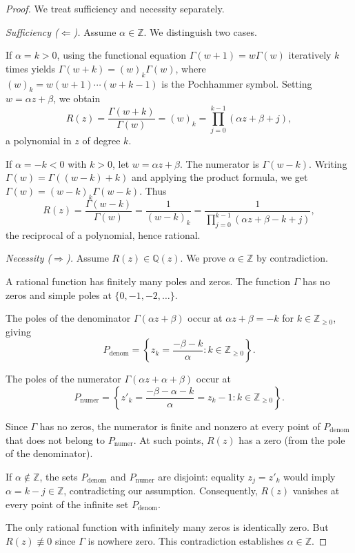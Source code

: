 \documentclass[11pt,reqno]{amsart}
\theoremstyle{definition}
\newcommand{\N}{\mathbb{Z}_{\ge 0}}
\newcommand{\Z}{\mathbb{Z}}
\newcommand{\Q}{\mathbb{Q}}
\numberwithin{equation}{section}
\begin{document}
\begin{proof}
We treat sufficiency and necessity separately.

\textit{Sufficiency ($\Leftarrow$).} Assume $\alpha \in \Z$. We distinguish two cases.

If $\alpha = k > 0$, using the functional equation $\Gamma(w+1) = w\Gamma(w)$ iteratively $k$ times yields $\Gamma(w+k) = (w)_k \Gamma(w)$, where $(w)_k = w(w+1)\cdots(w+k-1)$ is the Pochhammer symbol. Setting $w = \alpha z + \beta$, we obtain
$$R(z) = \frac{\Gamma(w+k)}{\Gamma(w)} = (w)_k = \prod_{j=0}^{k-1}(\alpha z + \beta + j),$$
a polynomial in $z$ of degree $k$.

If $\alpha = -k < 0$ with $k > 0$, let $w = \alpha z + \beta$. The numerator is $\Gamma(w-k)$. Writing $\Gamma(w) = \Gamma((w-k)+k)$ and applying the product formula, we get $\Gamma(w) = (w-k)_k \Gamma(w-k)$. Thus
$$R(z) = \frac{\Gamma(w-k)}{\Gamma(w)} = \frac{1}{(w-k)_k} = \frac{1}{\prod_{j=0}^{k-1}(\alpha z + \beta - k + j)},$$
the reciprocal of a polynomial, hence rational.

\textit{Necessity ($\Rightarrow$).} Assume $R(z) \in \Q(z)$. We prove $\alpha \in \Z$ by contradiction.

A rational function has finitely many poles and zeros. The function $\Gamma$ has no zeros and simple poles at $\{0, -1, -2, \ldots\}$.

The poles of the denominator $\Gamma(\alpha z + \beta)$ occur at $\alpha z + \beta = -k$ for $k \in \N$, giving
$$P_{\mathrm{denom}} = \left\{ z_k = \frac{-\beta - k}{\alpha} : k \in \N \right\}.$$

The poles of the numerator $\Gamma(\alpha z + \alpha + \beta)$ occur at
$$P_{\mathrm{numer}} = \left\{ z'_k = \frac{-\beta - \alpha - k}{\alpha} = z_k - 1 : k \in \N \right\}.$$

Since $\Gamma$ has no zeros, the numerator is finite and nonzero at every point of $P_{\mathrm{denom}}$ that does not belong to $P_{\mathrm{numer}}$. At such points, $R(z)$ has a zero (from the pole of the denominator).

If $\alpha \notin \Z$, the sets $P_{\mathrm{denom}}$ and $P_{\mathrm{numer}}$ are disjoint: equality $z_j = z'_k$ would imply $\alpha = k - j \in \Z$, contradicting our assumption. Consequently, $R(z)$ vanishes at every point of the infinite set $P_{\mathrm{denom}}$.

The only rational function with infinitely many zeros is identically zero. But $R(z) \not\equiv 0$ since $\Gamma$ is nowhere zero. This contradiction establishes $\alpha \in \Z$.
\end{proof}
\end{document}
